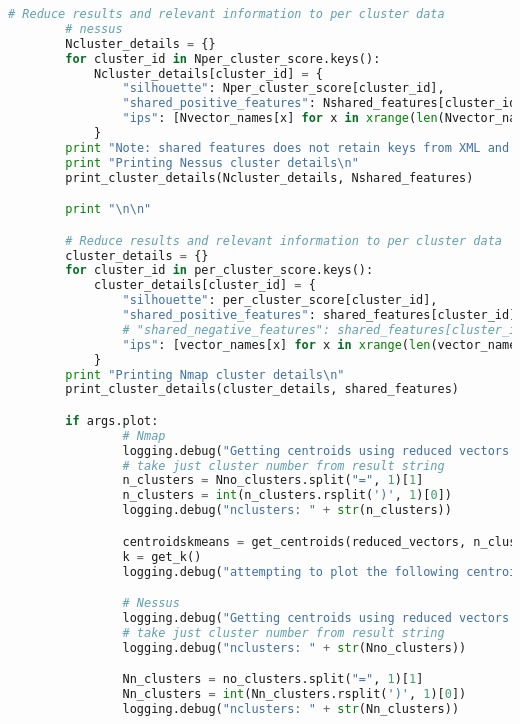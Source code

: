 \begin{lstlisting}[language=python]
        # Reduce results and relevant information to per cluster data
        # nessus
        Ncluster_details = {}
        for cluster_id in Nper_cluster_score.keys():
            Ncluster_details[cluster_id] = {
                "silhouette": Nper_cluster_score[cluster_id],
                "shared_positive_features": Nshared_features[cluster_id]['positive'],
                "ips": [Nvector_names[x] for x in xrange(len(Nvector_names)) if Nlabels[x] == cluster_id]
            }
        print "Note: shared features does not retain keys from XML and therefore wont always be human readable."
        print "Printing Nessus cluster details\n"
        print_cluster_details(Ncluster_details, Nshared_features)

        print "\n\n"

        # Reduce results and relevant information to per cluster data
        cluster_details = {}
        for cluster_id in per_cluster_score.keys():
            cluster_details[cluster_id] = {
                "silhouette": per_cluster_score[cluster_id],
                "shared_positive_features": shared_features[cluster_id]['positive'],
                # "shared_negative_features": shared_features[cluster_id]['negative'],
                "ips": [vector_names[x] for x in xrange(len(vector_names)) if labels[x] == cluster_id]
            }
        print "Printing Nmap cluster details\n"
        print_cluster_details(cluster_details, shared_features)

        if args.plot:
                # Nmap
                logging.debug("Getting centroids using reduced vectors for Nmap:")
                # take just cluster number from result string
                n_clusters = Nno_clusters.split("=", 1)[1]
                n_clusters = int(n_clusters.rsplit(')', 1)[0])
                logging.debug("nclusters: " + str(n_clusters))

                centroidskmeans = get_centroids(reduced_vectors, n_clusters)
                k = get_k()
                logging.debug("attempting to plot the following centroids:\n " + str(centroidskmeans) + "\n\n")

                # Nessus
                logging.debug("Getting centroids using reduced vectors for Nessus:")
                # take just cluster number from result string
                logging.debug("nclusters: " + str(Nno_clusters))

                Nn_clusters = no_clusters.split("=", 1)[1]
                Nn_clusters = int(Nn_clusters.rsplit(')', 1)[0])
                logging.debug("nclusters: " + str(Nn_clusters))


\end{lstlisting}
